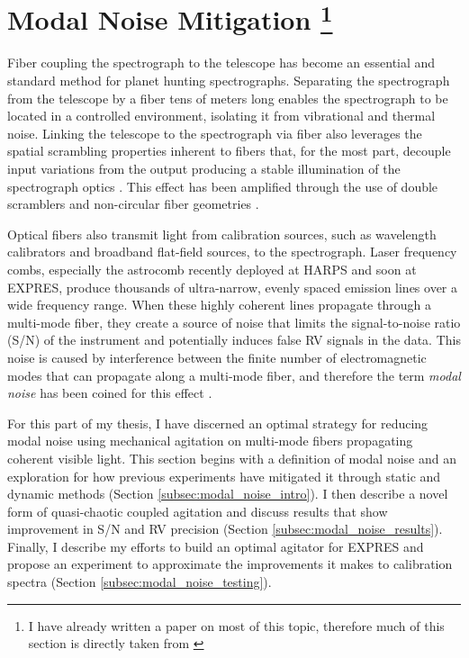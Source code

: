 \documentclass[11pt]{article}
\begin{document}
\section{Modal Noise Mitigation \footnote{I have already written a paper on most of this topic, therefore much of this section is directly taken from \citet{Petersburg2018}}}
\label{sec:modal_noise}

Fiber coupling the spectrograph to the telescope has become an essential and standard method for planet hunting spectrographs. Separating the spectrograph from the telescope by a fiber tens of meters long enables the spectrograph to be located in a controlled environment, isolating it from vibrational and thermal noise. Linking the telescope to the spectrograph via fiber also leverages the spatial scrambling properties inherent to fibers that, for the most part, decouple input variations from the output producing a stable illumination of the spectrograph optics \citep{Hunter1992}. This effect has been amplified through the use of double scramblers \citep{Halverson2015a, Spronck2015} and non-circular fiber geometries \citep{Chazelas2010, Spronck2012, Plavchan2013}.

Optical fibers also transmit light from calibration sources, such as wavelength calibrators and broadband flat-field sources, to the spectrograph. Laser frequency combs, especially the  astrocomb \citep{Probst2014} recently deployed at HARPS and soon at EXPRES, produce thousands of ultra-narrow, evenly spaced emission lines over a wide frequency range. When these highly coherent lines propagate through a multi-mode fiber, they create a source of noise that limits the signal-to-noise ratio (S/N) of the instrument and potentially induces false RV signals in the data. This noise is caused by interference between the finite number of electromagnetic modes that can propagate along a multi-mode fiber, and therefore the term \textit{modal noise} has been coined for this effect \citep{Epworth1978}.

For this part of my thesis, I have discerned an optimal strategy for reducing modal noise using mechanical agitation on multi-mode fibers propagating coherent visible light. This section begins with a definition of modal noise and an exploration for how previous experiments have mitigated it through static and dynamic methods (Section \ref{subsec:modal_noise_intro}). I then describe a novel form of quasi-chaotic coupled agitation and discuss results that show improvement in S/N and RV precision (Section \ref{subsec:modal_noise_results}). Finally, I describe my efforts to build an optimal agitator for EXPRES and propose an experiment to approximate the improvements it makes to calibration spectra (Section \ref{subsec:modal_noise_testing}).
\end{document}
